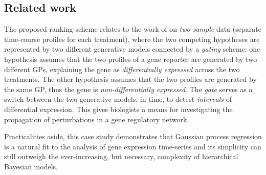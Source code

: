     \subsection{Related work} \label{subsec:chap2_related_work}
      The proposed ranking scheme relates to the work of \citet{stegle2010robust} on \textit{two-sample} data (separate time-course profiles for each treatment), where the two competing hypotheses are represented by two different generative models connected by a \textit{gating} scheme: one hypothesis assumes that the two profiles of a gene reporter are generated by two different GPs, explaining the gene as \textit{differentially expressed} across the two treatments.
      The other hypothesis assumes that the two profiles are generated by the same GP, thus the gene is \textit{non-differentially expressed}.
      The \textit{gate} serves as a switch between the two generative models, in time, to detect \textit{intervals} of differential expression.
      This gives biologists a means for investigating the propagation of perturbations in a gene regulatory network.

      Practicalities aside, this case study demonstrates that
      Gaussian process regression is a natural fit to the analysis of gene expression
      time-series and its simplicity can still outweigh the ever-increasing, but
      necessary, complexity of hierarchical Bayesian models.

